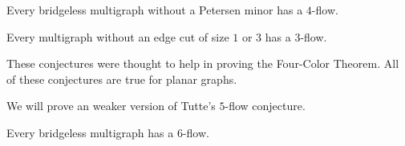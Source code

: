 \begin{conjecture}
	Every bridgeless multigraph without a Petersen minor has a \(4\)-flow.	
\end{conjecture}

\begin{conjecture}
	Every multigraph without an edge cut of size \(1\) or \(3\) has a \(3\)-flow.
\end{conjecture}

These conjectures were thought to help in proving the Four-Color Theorem.
All of these conjectures are true for planar graphs.

We will prove an weaker version of Tutte's \(5\)-flow conjecture.

\begin{theorem}
	Every bridgeless multigraph has a \(6\)-flow.
\end{theorem}

